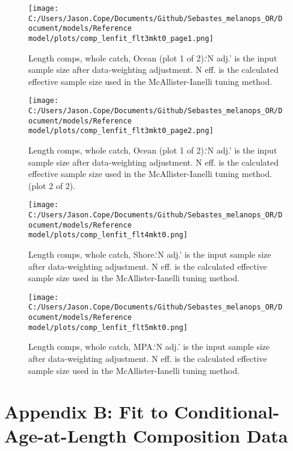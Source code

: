 \documentclass[11pt,
  english,
  letterpaper,
]{article}
\begin{document}
\begin{figure}
\centering
\texttt{[image: C:/Users/Jason.Cope/Documents/Github/Sebastes\_melanops\_OR/Document/models/Reference model/plots/comp\_lenfit\_flt3mkt0\_page1.png]}
\caption{Length comps, whole catch, Ocean (plot 1 of 2).`N adj.' is the input sample size after data-weighting adjustment. N eff. is the calculated effective sample size used in the McAllister-Ianelli tuning method.\label{fig:comp_lenfit_flt3mkt0_page1}}
\end{figure}

\begin{figure}
\centering
\texttt{[image: C:/Users/Jason.Cope/Documents/Github/Sebastes\_melanops\_OR/Document/models/Reference model/plots/comp\_lenfit\_flt3mkt0\_page2.png]}
\caption{Length comps, whole catch, Ocean (plot 1 of 2).`N adj.' is the input sample size after data-weighting adjustment. N eff. is the calculated effective sample size used in the McAllister-Ianelli tuning method. (plot 2 of 2).\label{fig:comp_lenfit_flt3mkt0_page2}}
\end{figure}

\begin{figure}
\centering
\texttt{[image: C:/Users/Jason.Cope/Documents/Github/Sebastes\_melanops\_OR/Document/models/Reference model/plots/comp\_lenfit\_flt4mkt0.png]}
\caption{Length comps, whole catch, Shore.`N adj.' is the input sample size after data-weighting adjustment. N eff. is the calculated effective sample size used in the McAllister-Ianelli tuning method.\label{fig:comp_lenfit_flt4mkt0}}
\end{figure}

\begin{figure}
\centering
\texttt{[image: C:/Users/Jason.Cope/Documents/Github/Sebastes\_melanops\_OR/Document/models/Reference model/plots/comp\_lenfit\_flt5mkt0.png]}
\caption{Length comps, whole catch, MPA.`N adj.' is the input sample size after data-weighting adjustment. N eff. is the calculated effective sample size used in the McAllister-Ianelli tuning method.\label{fig:comp_lenfit_flt5mkt0}}
\end{figure}

\clearpage

\hypertarget{app-b}{%
\section{Appendix B: Fit to Conditional-Age-at-Length Composition Data}\label{app-b}}
\end{document}
